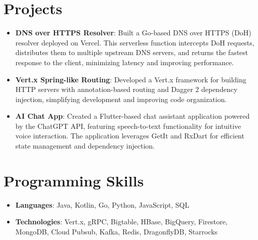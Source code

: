 \documentclass[letterpaper,11pt]{article}
\newcommand{\resumeItem}[2]{
    \item\small{
        \textbf{#1}{: #2 \vspace{-2pt}}
    }
}
\newcommand{\resumeSubItem}[2]{\resumeItem{#1}{#2}\vspace{-4pt}}
\newcommand{\resumeSubHeadingListStart}{\begin{itemize}[leftmargin=*]}
\newcommand{\resumeSubHeadingListEnd}{\end{itemize}}
\begin{document}
    \section{Projects}
    \resumeSubHeadingListStart
    \resumeSubItem{DNS over HTTPS Resolver}
    {Built a Go-based DNS over HTTPS (DoH) resolver deployed on Vercel. This serverless function intercepts DoH requests, distributes them to multiple upstream DNS servers, and returns the fastest response to the client, minimizing latency and improving performance.}
    \resumeSubItem{Vert.x Spring-like Routing}
    {Developed a Vert.x framework for building HTTP servers with annotation-based routing and Dagger 2 dependency injection, simplifying development and improving code organization.}
    \resumeSubItem{AI Chat App}
    {Created a Flutter-based chat assistant application powered by the ChatGPT API, featuring speech-to-text functionality for intuitive voice interaction. The application leverages GetIt and RxDart for efficient state management and dependency injection.}
    \resumeSubHeadingListEnd

%
    \section{Programming Skills}
    \resumeSubHeadingListStart
    \resumeSubItem{Languages}
    {Java, Kotlin, Go, Python, JavaScript, SQL}
    \resumeSubItem{Technologies}
    {Vert.x, gRPC, Bigtable, HBase, BigQuery, Firestore, MongoDB, Cloud Pubsub, Kafka, Redis, DragonflyDB, Starrocks}
    \resumeSubHeadingListEnd


\end{document}
